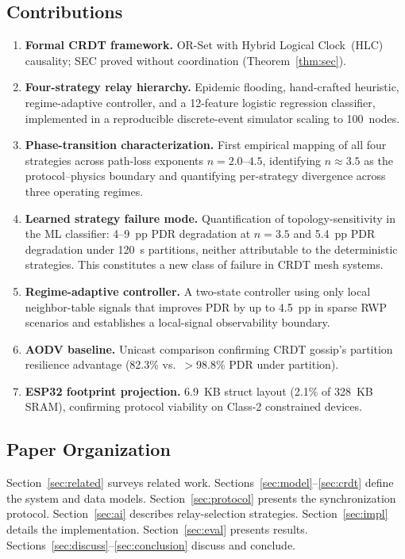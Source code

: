 \documentclass[conference]{IEEEtran}
\begin{document}
\subsection{Contributions}
\begin{enumerate}
  \item \textbf{Formal CRDT framework.}  OR-Set with Hybrid Logical Clock~(HLC)
        causality; SEC proved without coordination (Theorem~\ref{thm:sec}).
  \item \textbf{Four-strategy relay hierarchy.}  Epidemic flooding, hand-crafted
        heuristic, regime-adaptive controller, and a 12-feature logistic regression
        classifier, implemented in a reproducible discrete-event simulator scaling
        to 100~nodes.
  \item \textbf{Phase-transition characterization.}  First empirical mapping of
        all four strategies across path-loss exponents $n = 2.0$--$4.5$, identifying
        $n \approx 3.5$ as the protocol--physics boundary and quantifying
        per-strategy divergence across three operating regimes.
  \item \textbf{Learned strategy failure mode.}  Quantification of topology-sensitivity
        in the ML classifier: 4--9~pp PDR degradation at $n = 3.5$ and 5.4~pp PDR
        degradation under 120~s partitions, neither attributable to the deterministic
        strategies.  This constitutes a new class of failure in CRDT mesh systems.
  \item \textbf{Regime-adaptive controller.}  A two-state controller using only local
        neighbor-table signals that improves PDR by up to 4.5~pp in sparse RWP scenarios
        and establishes a local-signal observability boundary.
  \item \textbf{AODV baseline.}  Unicast comparison confirming CRDT gossip's partition
        resilience advantage (82.3\% vs.\ $>$98.8\% PDR under partition).
  \item \textbf{ESP32 footprint projection.}  6.9~KB struct layout (2.1\% of 328~KB SRAM),
        confirming protocol viability on Class-2 constrained devices.
\end{enumerate}

\subsection{Paper Organization}
Section~\ref{sec:related} surveys related work.  Sections~\ref{sec:model}--\ref{sec:crdt}
define the system and data models.  Section~\ref{sec:protocol} presents the
synchronization protocol.  Section~\ref{sec:ai} describes relay-selection strategies.
Section~\ref{sec:impl} details the implementation.  Section~\ref{sec:eval} presents
results.  Sections~\ref{sec:discuss}--\ref{sec:conclusion} discuss and conclude.
\end{document}
